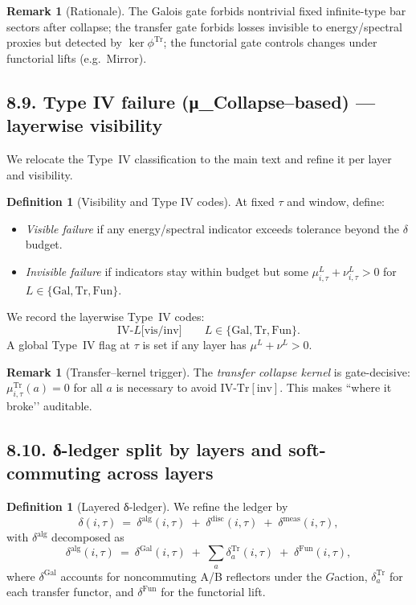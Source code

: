 \documentclass[11pt]{article}
\numberwithin{equation}{section}
\theoremstyle{plain}
\theoremstyle{definition}
\theoremstyle{remark}
\DeclareRobustCommand{\hyp}{\nobreakdash-}
\theoremstyle{plain}
\theoremstyle{definition}
\numberwithin{equation}{section}
\theoremstyle{definition}
\newtheorem{definition}[theorem]{Definition}
\newtheorem{remark}[theorem]{Remark}
\numberwithin{equation}{section}
\theoremstyle{plain}
\theoremstyle{definition}
\theoremstyle{remark}
\begin{document}
\begin{remark}[Rationale]
The Galois gate forbids nontrivial fixed infinite\hyp type bar sectors after collapse; the transfer gate forbids losses invisible to energy/spectral proxies but detected by \(\ker\phi^{\mathrm{Tr}}\); the functorial gate controls changes under functorial lifts (e.g.\ Mirror).
\end{remark}

\subsection*{8.9. Type IV failure (μ\_Collapse–based) — layerwise visibility}
We relocate the Type~IV classification to the main text and refine it per layer and visibility.

\begin{definition}[Visibility and Type IV codes]\label{def:type-iv}
At fixed \(\tau\) and window, define:
\begin{itemize}
  \item \emph{Visible failure} if any energy/spectral indicator exceeds tolerance beyond the $\delta$ budget.
  \item \emph{Invisible failure} if indicators stay within budget but some \(\mu^L_{i,\tau}+\nu^L_{i,\tau}>0\) for \(L\in\{\mathrm{Gal},\mathrm{Tr},\mathrm{Fun}\}\).
\end{itemize}
We record the layerwise Type~IV codes:
\[
\mathrm{IV}\text{-}L\big[\mathrm{vis}/\mathrm{inv}\big]\qquad L\in\{\mathrm{Gal},\mathrm{Tr},\mathrm{Fun}\}.
\]
A global Type~IV flag at \(\tau\) is set if any layer has \(\mu^L+\nu^L>0\).
\end{definition}

\begin{remark}[Transfer–kernel trigger]
The \emph{transfer collapse kernel} is gate\hyp decisive: \(\mu^{\mathrm{Tr}}_{i,\tau}(a)=0\) for all \(a\) is necessary to avoid \(\mathrm{IV}\text{-}\mathrm{Tr}[\mathrm{inv}]\). This makes “where it broke’’ auditable.
\end{remark}

\subsection*{8.10. δ-ledger split by layers and soft-commuting across layers}
\begin{definition}[Layered δ-ledger]\label{def:layer-delta}
We refine the ledger by
\[
\delta(i,\tau)\ =\ \delta^{\mathrm{alg}}(i,\tau)\;+\;\delta^{\mathrm{disc}}(i,\tau)\;+\;\delta^{\mathrm{meas}}(i,\tau),
\]
with \(\delta^{\mathrm{alg}}\) decomposed as
\[
\delta^{\mathrm{alg}}(i,\tau)\ =\ \delta^{\mathrm{Gal}}(i,\tau)\;+\;\sum_{a}\delta^{\mathrm{Tr}}_a(i,\tau)\;+\;\delta^{\mathrm{Fun}}(i,\tau),
\]
where \(\delta^{\mathrm{Gal}}\) accounts for noncommuting A/B reflectors under the \(G\)\nobreakdash action, \(\delta^{\mathrm{Tr}}_a\) for each transfer functor, and \(\delta^{\mathrm{Fun}}\) for the functorial lift.
\end{definition}
\end{document}
